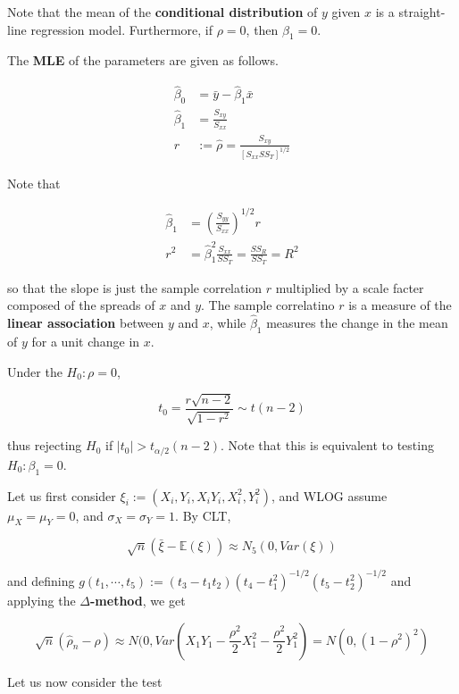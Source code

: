 \documentclass[12pt]{article}
\begin{document}
Note that the mean of the \textbf{conditional distribution} of $y$ given $x$ is a straight-line regression model. Furthermore, if $\rho=0$, then $\beta_1 = 0$. 

\bigskip

The \textbf{MLE} of the parameters are given as follows.

$$
\begin{aligned}
\hat{\beta}_0 &= \bar{y} - \hat{\beta}_1 \bar{x} \\[8pt]
\hat{\beta}_1 &= \frac{S_{xy}}{S_{xx}} \\[10pt]
r &:= \hat{\rho} = \frac{S_{xy}}{ \left[ S_{xx}SS_T \right]^{1/2}}
\end{aligned}
$$

Note that 

$$
\begin{aligned}
\hat{\beta}_1 &= \left(\frac{S_{yy}}{S_{xx}} \right)^{1/2} r \\[10pt]
r^2 &= \hat{\beta}_1^2 \frac{S_{xx}}{SS_T} = \frac{SS_R}{SS_T} = R^2
\end{aligned}
$$

so that the slope is just the sample correlation $r$ multiplied by a scale facter composed of the spreads of $x$ and $y$. The sample correlatino $r$ is a measure of the \textbf{linear association} between $y$ and $x$, while $\hat{\beta}_1$ measures the change in the mean of $y$ for a unit change in $x$.

Under the $H_0 : \rho = 0$,

$$
t_0 = \frac{r\sqrt{n-2}}{\sqrt{1 - r^2}} \sim t(n-2)
$$

thus rejecting $H_0$ if $|t_0| > t_{\alpha/2}(n-2)$. Note that this is equivalent to testing $H_0 : \beta_1 = 0$. 

\bigskip

Let us first consider $\xi_i := (X_i, Y_i, X_iY_i, X_i^2, Y_i^2)$, and WLOG assume $\mu_X = \mu_Y =0$, and $\sigma_X = \sigma_Y = 1$. By CLT,

$$
\sqrt{n} \left( \bar{\xi} - \mathbb{E}(\xi) \right) \approx N_5(0, Var(\xi)) 
$$

and defining $g(t_1, \cdots, t_5) := (t_3 - t_1 t_2) (t_4 - t_1^2)^{-1/2} (t_5 - t_2^2) ^{-1/2}$ and applying the \textbf{$\Delta$-method}, we get

$$
\sqrt{n} (\hat{\rho}_n - \rho) \approx N(0, Var(X_1 Y_1 - \frac{\rho^2}{2} X_1^2-  \frac{\rho^2}{2} Y_1^2) = N(0, (1-\rho^2)^2)
$$

Let us now consider the test
\end{document}
